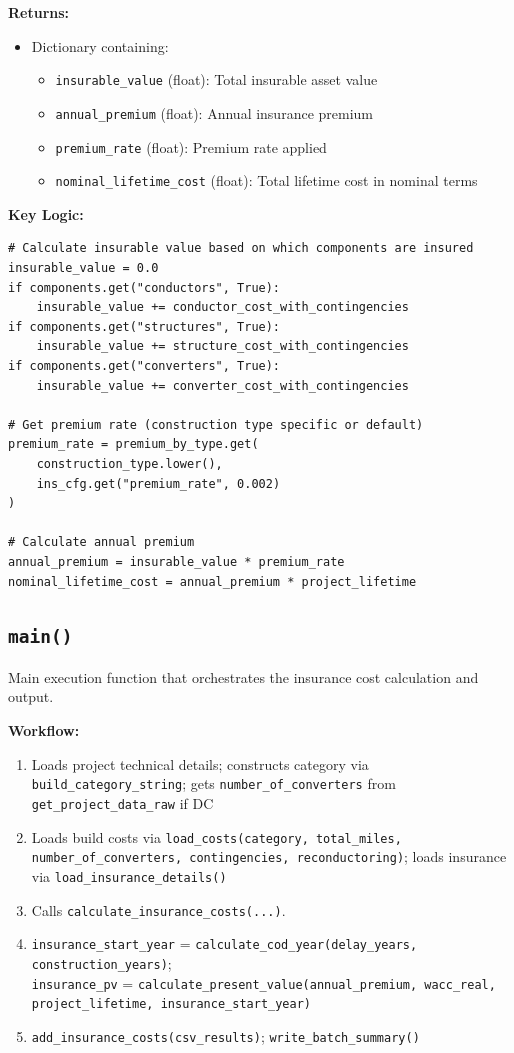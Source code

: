 \documentclass[ctcc_full_documentation.tex]{subfiles}
\begin{document}
\textbf{Returns:}
\begin{itemize}
    \item Dictionary containing:
    \begin{itemize}
        \item \texttt{insurable\_value} (float): Total insurable asset value
        \item \texttt{annual\_premium} (float): Annual insurance premium
        \item \texttt{premium\_rate} (float): Premium rate applied
        \item \texttt{nominal\_lifetime\_cost} (float): Total lifetime cost in nominal terms
    \end{itemize}
\end{itemize}

\textbf{Key Logic:}
\begin{lstlisting}
# Calculate insurable value based on which components are insured
insurable_value = 0.0
if components.get("conductors", True):
    insurable_value += conductor_cost_with_contingencies
if components.get("structures", True):
    insurable_value += structure_cost_with_contingencies
if components.get("converters", True):
    insurable_value += converter_cost_with_contingencies

# Get premium rate (construction type specific or default)
premium_rate = premium_by_type.get(
    construction_type.lower(), 
    ins_cfg.get("premium_rate", 0.002)
)

# Calculate annual premium
annual_premium = insurable_value * premium_rate
nominal_lifetime_cost = annual_premium * project_lifetime
\end{lstlisting}

\subsection{\texttt{main()}}

Main execution function that orchestrates the insurance cost calculation and output.

\textbf{Workflow:}
\begin{enumerate}
    \item Loads project technical details; constructs category via \texttt{build\_category\_string}; gets \texttt{number\_of\_converters} from \texttt{get\_project\_data\_raw} if DC
    \item Loads build costs via \texttt{load\_costs(category, total\_miles, number\_of\_converters, contingencies, reconductoring)}; loads insurance via \texttt{load\_insurance\_details()}
    \item Calls \texttt{calculate\_insurance\_costs(...)}.
    \item \texttt{insurance\_start\_year} = \texttt{calculate\_cod\_year(delay\_years, construction\_years)};\\
    \texttt{insurance\_pv} = \texttt{calculate\_present\_value(annual\_premium, wacc\_real, project\_lifetime, insurance\_start\_year)}
    \item \texttt{add\_insurance\_costs(csv\_results)}; \texttt{write\_batch\_summary()}
\end{enumerate}
\end{document}
